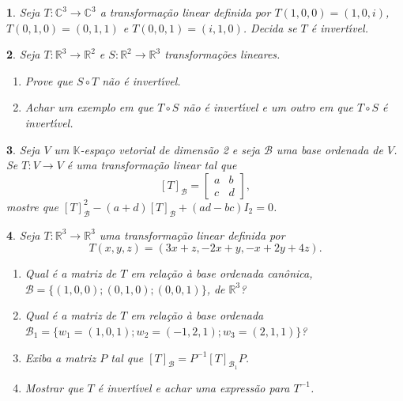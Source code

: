 \documentclass[12pt]{exam}
\newtheorem{exercicio}{}
\newcommand{\real}{\mathbb{R}}
\newcommand{\complex}{\mathbb{C}}
\newcommand{\cp}[1]{\mathbb{#1}}
\begin{document}
\begin{exercicio}
  Seja $T : \complex^3 \to \complex^3$ a transforma\c{c}\~ao linear definida por $T(1,0,0) = (1,0,i)$, $T(0,1,0) = (0,1,1)$ e $T(0,0,1) = (i,1,0)$. Decida se $T$ \'e invert{\'\i}vel.
\end{exercicio}

\begin{exercicio}
  Seja $T : \real^3 \to \real^2$ e $S : \real^2 \to \real^3$ transforma\c{c}\~oes lineares.
  \begin{enumerate}[label=({\alph*})]
    \item Prove que $S \circ T$ n\~ao \'e invert{\'\i}vel.
    \item Achar um exemplo em que $T\circ S$ n\~ao \'e invert{\'\i}vel e um outro em que $T\circ S$ \'e invert{\'\i}vel.
  \end{enumerate}
\end{exercicio}

\begin{exercicio}
  Seja $V$ um $\cp{K}$-espa\c{c}o vetorial de dimens\~ao 2 e seja $\mathcal{B}$ uma base ordenada de $V$. Se $T: V \to V$ \'e uma transforma\c{c}\~ao linear tal que
  \[
    [T]_\mathcal{B} = \begin{bmatrix}
      a & b\\
      c & d
    \end{bmatrix},
  \]
  mostre que $[T]_\mathcal{B}^2 - (a + d)[T]_\mathcal{B} + (ad - bc)I_2 = 0$.
\end{exercicio}

\begin{exercicio}
  Seja $T : \real^3 \to \real^3$ uma transforma\c{c}\~ao linear definida por
  \[
    T(x,y,z) = (3x + z,-2x + y,-x+2y + 4z).
  \]
  \begin{enumerate}[label=({\alph*})]
    \item Qual \'e a matriz de $T$ em rela\c{c}\~ao \`a base ordenada can\^onica, $\mathcal{B} = \{(1,0,0); (0,1,0); (0,0,1)\}$, de $\real^3$?
    \item Qual \'e a matriz de $T$ em rela\c{c}\~ao \`a base ordenada $\mathcal{B}_1 = \{w_1 = (1,0,1); w_2 = (-1,2,1); w_3 = (2,1,1)\}$?
    \item Exiba a matriz $P$ tal que $[T]_{\mathcal{B}} = P^{-1}[T]_{\mathcal{B}_1}P$.
    \item Mostrar que $T$ \'e invert{\'\i}vel e achar uma express\~ao para $T^{-1}$.
  \end{enumerate}
\end{exercicio}
\end{document}
